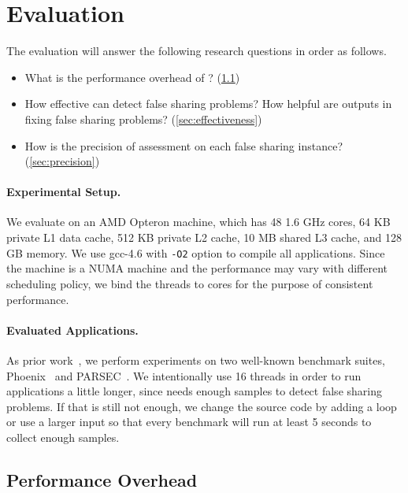 \section{Evaluation}
\label{sec:eval}

\sloppy{}
The evaluation will answer the following research questions in order as follows. 

\begin{itemize}
\item What is the performance overhead of \cheetah{}? (\ref{sec:perf})

\item How effective can \cheetah{} detect false sharing problems? How helpful are outputs in fixing false sharing problems?  (\ref{sec:effectiveness})

\item How is the precision of assessment on each false sharing instance?  (\ref{sec:precision})

\end{itemize}

\paragraph{Experimental Setup.} We evaluate \cheetah{} on an AMD Opteron machine, which has 48 1.6 GHz cores, 64 KB private L1 data cache, 512 KB private L2 cache, 10 MB shared L3 cache, and 128 GB memory. We use gcc-4.6 with {\tt -O2} option to compile all applications. Since the machine is a NUMA machine and the performance may vary with different scheduling policy, we bind the threads to cores for the purpose of consistent performance.   

\paragraph{Evaluated Applications.} As prior work~\cite{Sheriff, Predator, qinzhao, mldetect}, we perform experiments on two well-known benchmark suites, Phoenix~\cite{phoenix-hpca} and PARSEC~\cite{parsec}. We intentionally use 16 threads in order to run applications a little longer, since \cheetah{} needs enough samples to detect false sharing problems. If that is still not enough, we change the source code by adding a loop or use a larger input so that every benchmark will run at least 5 seconds to collect enough samples.

\subsection{Performance Overhead}
\label{sec:perf}

